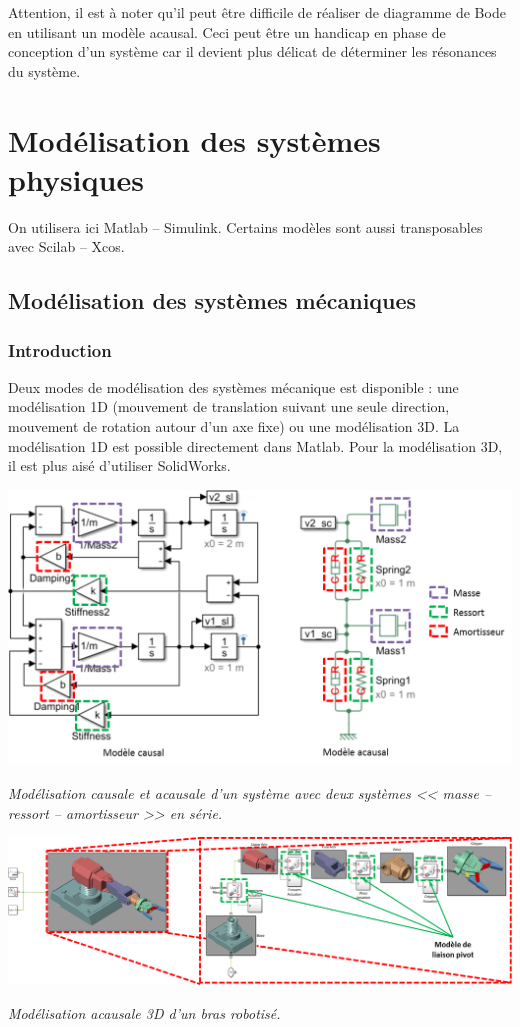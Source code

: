 \documentclass[10pt,fleqn]{article} %
\begin{document}
\begin{warn}
Attention, il est à noter qu'il peut être difficile de réaliser de diagramme de Bode en utilisant un modèle acausal. Ceci peut être un handicap en phase de conception d'un système car il devient plus délicat de déterminer les résonances du système.
\end{warn}
\section{Modélisation des systèmes physiques}
On utilisera ici Matlab -- Simulink. Certains modèles sont aussi transposables avec Scilab -- Xcos. 

\subsection{Modélisation des systèmes mécaniques}
\subsubsection{Introduction}
Deux modes de modélisation des systèmes mécanique est disponible : une modélisation 1D (mouvement de translation suivant une seule direction, mouvement de rotation autour d'un axe fixe) ou une modélisation 3D. 
La modélisation 1D est possible directement dans Matlab. Pour la modélisation 3D, il est plus aisé d'utiliser SolidWorks. 

\begin{center}
\includegraphics[width=.6\linewidth]{images/Masse_Ressort}

\textit{Modélisation causale et acausale d'un système avec deux systèmes << masse -- ressort -- amortisseur >> en série.}
\end{center}

\begin{center}
\includegraphics[width=.9\linewidth]{images/Modele3D}

\textit{Modélisation acausale 3D d'un bras robotisé.}
\end{center}
\end{document}
